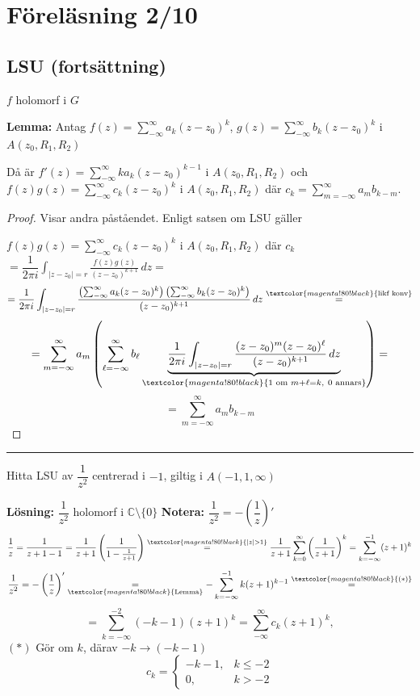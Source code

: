 \section{Föreläsning 2/10}
\subsection{LSU (fortsättning)}
$f$ holomorf i $G$

\textbf{Lemma:} Antag $f(z) = \sum_{-\infty}^\infty a_k(z - z_0)^k$, $g(z) = \sum_{-\infty}^\infty b_k(z - z_0)^k$ i $A(z_0, R_1, R_2)$

Då är $f'(z) = \sum_{-\infty}^\infty ka_k(z - z_0)^{k-1}$ i $A(z_0, R_1, R_2)$ och $f(z)g(z) = \sum_{-\infty}^\infty c_k(z - z_0)^k$ i $A(z_0, R_1, R_2)$ där $c_k = \sum_{m = -\infty}^\infty a_m b_{k-m}$.

\begin{proof}
Visar andra påståendet. Enligt satsen om LSU gäller

$f(z)g(z) = \sum_{-\infty}^\infty c_k(z - z_0)^k$ i $A(z_0, R_1, R_2)$ där \emph{$c_k$} $= \dfrac{1}{2\pi i} \displaystyle\int_{|z - z_0| = r} \frac{f(z)g(z)}{(z - z_0)^{k+1}}\,dz =$
\[ = \frac{1}{2\pi i} \int_{|z - z_0| = r} \frac{\left( \sum_{-\infty}^\infty a_k(z - z_0)^k \right)\left( \sum_{-\infty}^\infty b_k(z - z_0)^k \right)}{(z - z_0)^{k+1}}\,dz \overset{\textcolor{magenta!80!black}{\text{likf konv}}}{=} \]
\[ = \sum_{m = -\infty}^\infty a_m\left( \sum_{\ell = -\infty}^\infty b_\ell \underbrace{\frac{1}{2\pi i} \int_{|z - z_0| = r} \frac{(z - z_0)^m(z - z_0)^\ell}{(z - z_0)^{k+1}}\,dz}_{\textcolor{magenta!80!black}{1 \text{ om } m + \ell = k,\ 0 \text{ annars}}} \right) = \]
\[ = \sum_{m = -\infty}^\infty a_m b_{k-m} \]
\end{proof}

\noindent\rule{\linewidth}{0.4pt}

\begin{example}
Hitta LSU av $\dfrac{1}{z^2}$ centrerad i $-1$, giltig i $A(-1, 1, \infty)$

\textbf{Lösning:} $\dfrac{1}{z^2}$ holomorf i $\mathbb{C} \setminus \{0\}$
\textcolor{red!70!black}{\textbf{Notera:}} $\dfrac{1}{z^2} = -\left( \dfrac{1}{z} \right)'$
\[ \frac{1}{z} = \frac{1}{z + 1 - 1} = \frac{1}{z + 1}\left( \frac{1}{1 - \frac{1}{z + 1}} \right) \overset{\textcolor{magenta!80!black}{|z| > 1}}{=} \frac{1}{z + 1} \sum_{k = 0}^\infty \left( \frac{1}{z + 1} \right)^k = \sum_{k = -\infty}^{-1} (z + 1)^k \]
\[ \frac{1}{z^2} = -\left( \frac{1}{z} \right)' \underset{\textcolor{magenta!80!black}{\text{Lemma}}}{=} -\sum_{k = -\infty}^{-1} k(z + 1)^{k-1} \overset{\textcolor{magenta!80!black}{(*)}}{=} \]
\[ = \sum_{k = -\infty}^{-2} (-k - 1)(z + 1)^k = \sum_{-\infty}^\infty c_k(z + 1)^k, \]
\textcolor{magenta!80!black}{$(*)$ Gör om $k$, därav $-k \to (-k - 1)$}
\[ c_k = \begin{cases} -k - 1, & k \le -2 \\ 0, & k > -2 \end{cases} \]
\end{example}

